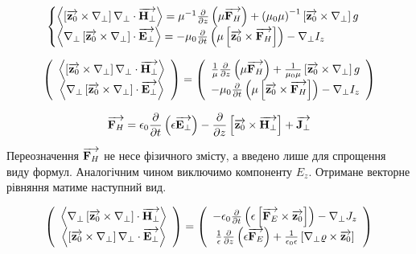 \textcolor{lightgray}{ \begin{equation*} \begin{aligned}
\begin{cases} 
\left< \left[ \overrightarrow{\mathbf z_0} \times \nabla_\perp \right] \nabla_\perp \cdot \overrightarrow{\mathbf H_\perp} \right> = 
\mu^{-1} \frac{\partial }{\partial z} \left( \mu \overrightarrow{\mathbf F_H} \right) +
\left( \mu_0 \mu \right)^{-1} \left[ \overrightarrow{\mathbf z_0} \times \nabla_\perp \right] g \\
\left< \nabla_\perp \left[ \overrightarrow{\mathbf z_0} \times \nabla_\perp \right] \cdot \overrightarrow{\mathbf E_\perp} \right>
= - \mu_0 \frac{\partial }{\partial t} \left( \mu \left[ \overrightarrow{\mathbf z_0} \times \overrightarrow{\mathbf F_H} \right] \right) -
\nabla_\perp I_z 
\end{cases}
\end{aligned} \end{equation*} }

\begin{equation}
\left( \begin{array}{c} 
\left< \left[ \overrightarrow{\mathbf z_0} \times \nabla_\perp \right] \nabla_\perp \cdot \overrightarrow{\mathbf H_\perp} \right> \\
\left< \nabla_\perp \left[ \overrightarrow{\mathbf z_0} \times \nabla_\perp \right] \cdot \overrightarrow{\mathbf E_\perp} \right> \\
\end{array} \right) = \left( \begin{array}{c} 
\frac{1}{\mu} \frac{\partial }{\partial z} \left( \mu \overrightarrow{\mathbf F_H} \right) +
\frac{1}{\mu_0 \mu} \left[ \overrightarrow{\mathbf z_0} \times \nabla_\perp \right] g \\
- \mu_0 \frac{\partial }{\partial t} \left( \mu \left[ \overrightarrow{\mathbf z_0} \times \overrightarrow{\mathbf F_H} \right] \right) -
\nabla_\perp I_z 
\end{array} \right)
\end{equation}

\begin{equation*}
\overrightarrow{\mathbf F_H} = \epsilon_0 \frac{\partial }{\partial t} \left( \epsilon \overrightarrow{\mathbf E_\perp} \right) - 
\frac{\partial }{\partial z} \left[ \overrightarrow{\mathbf z_0} \times \overrightarrow{\mathbf H_\perp} \right] + \overrightarrow{\mathbf J_\perp}
\end{equation*}

Переозначення $ \overrightarrow{\mathbf F_H} $ не несе фізичного змісту, а введено лише для 
спрощення виду формул. Аналогічним чином виключимо компоненту $ E_z $. Отримане 
векторне рівняння матиме наступний вид.

\begin{equation}
\left( \begin{array}{c} 
\left< \nabla_\perp \left[ \overrightarrow{\mathbf z_0} \times \nabla_\perp \right] \cdot \overrightarrow{\mathbf H_\perp} \right> \\
\left< \left[ \overrightarrow{\mathbf z_0} \times \nabla_\perp \right] \nabla_\perp \cdot \overrightarrow{\mathbf E_\perp} \right> \\
\end{array} \right) = \left( \begin{array}{c} 
- \epsilon_0 \frac{\partial }{\partial t} \left( \epsilon \left[ \overrightarrow{\mathbf F_E} \times \overrightarrow{\mathbf z_0} \right] 
\right) - \nabla_\perp J_z \\
\frac{1}{\epsilon} \frac{\partial }{\partial z} \left( \epsilon \overrightarrow{\mathbf F_E} \right) +
\frac{1}{\epsilon_0 \epsilon} \left[ \nabla_\perp \varrho \times \overrightarrow{\mathbf z_0} \right]
\end{array} \right)
\end{equation}

